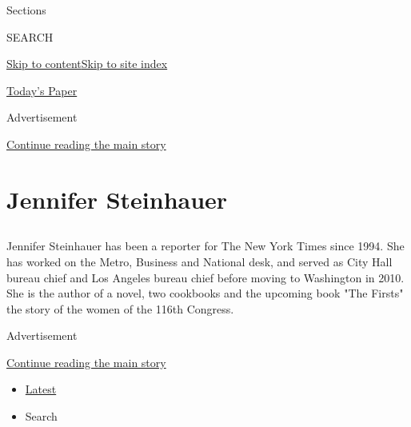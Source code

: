 Sections

SEARCH

\protect\hyperlink{site-content}{Skip to
content}\protect\hyperlink{site-index}{Skip to site index}

\href{https://myaccount.nytimes3xbfgragh.onion/auth/login?response_type=cookie\&client_id=vi}{}

\href{https://www.nytimes3xbfgragh.onion/section/todayspaper}{Today's
Paper}

Advertisement

\protect\hyperlink{after-top}{Continue reading the main story}

\hypertarget{jennifer-steinhauer}{%
\section{Jennifer Steinhauer}\label{jennifer-steinhauer}}

\subsection{}

Jennifer Steinhauer has been a reporter for The New York Times since
1994. She has worked on the Metro, Business and National desk, and
served as City Hall bureau chief and Los Angeles bureau chief before
moving to Washington in 2010. She is the author of a novel, two
cookbooks and the upcoming book "The Firsts" the story of the women of
the 116th Congress.

Advertisement

\protect\hyperlink{after-mid1}{Continue reading the main story}

\begin{itemize}
\tightlist
\item
  \protect\hyperlink{stream-panel}{Latest}
\item
  Search
\end{itemize}

